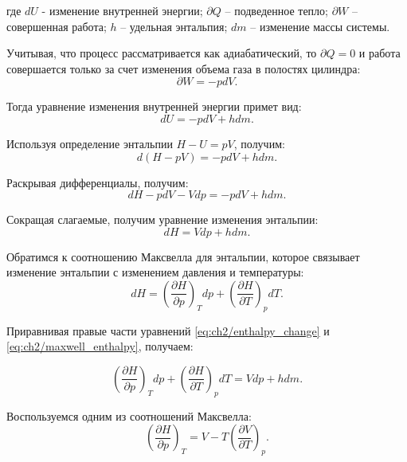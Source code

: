 где $dU$ - изменение внутренней энергии;
$\partial Q$ -- подведенное тепло;
$\partial W$ -- совершенная работа;
$h$ -- удельная энтальпия;
$dm$ -- изменение массы системы.

Учитывая, что процесс рассматривается как адиабатический,
то $\partial Q = 0$ и работа совершается только за счет изменения объема газа в полостях цилиндра:
\begin{equation}
\label{eq:ch2/work}
    \partial W = -pdV.
\end{equation}

Тогда уравнение изменения внутренней энергии примет вид:
\begin{equation}
\label{eq:ch2/internal_energy_change}
    dU = -pdV + hdm.
\end{equation}

Используя определение энтальпии $H - U = pV$, получим:
\begin{equation}
\label{eq:ch2/enthalpy_definition}
    d(H-pV) = -pdV + hdm.
\end{equation}

Раскрывая дифференциалы, получим:
\begin{equation}
\label{eq:ch2/enthalpy_differential}
    dH - pdV - Vdp = -pdV + hdm.
\end{equation}

Сокращая слагаемые, получим уравнение изменения энтальпии:
\begin{equation}
\label{eq:ch2/enthalpy_change}
    dH = Vdp + hdm.
\end{equation}

Обратимся к соотношению Максвелла для энтальпии, которое связывает изменение
энтальпии с изменением давления и температуры:
\begin{equation}
\label{eq:ch2/maxwell_enthalpy}
    dH = \left(
    \frac{\partial H}{\partial p}
    \right)_T dp + \left(
    \frac{\partial H}{\partial T}
    \right)_p dT.
\end{equation}

Приравнивая правые части уравнений \eqref{eq:ch2/enthalpy_change} и \eqref{eq:ch2/maxwell_enthalpy}, получаем:

\begin{equation}
\label{eq:ch2/enthalpy_equality}
    \left(
    \frac{\partial H}{\partial p}
    \right)_T dp + \left(
    \frac{\partial H}{\partial T}
    \right)_p dT = Vdp + hdm.
\end{equation}

Воспользуемся одним из соотношений Максвелла:
\begin{equation}
\label{eq:ch2/maxwell_relation}
    \left(
    \frac{\partial H}{\partial p}
    \right)_T = V - T \left(
    \frac{\partial V}{\partial T}
    \right)_p.
\end{equation}

